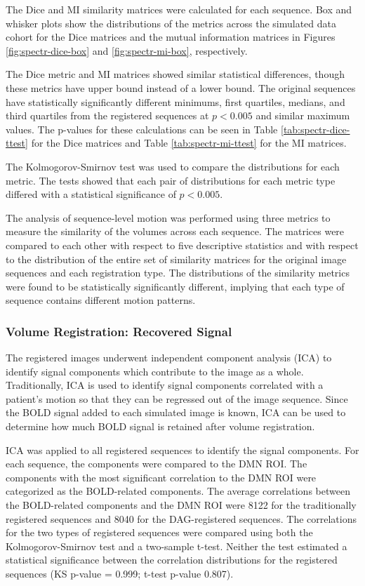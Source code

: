 The Dice and MI similarity matrices were calculated for each sequence. Box and whisker plots show the distributions of the metrics across the simulated data cohort for the Dice matrices and the mutual information matrices in Figures \ref{fig:spectr-dice-box} and \ref{fig:spectr-mi-box}, respectively.  


The Dice metric and MI matrices showed similar statistical differences, though these metrics have upper bound instead of a lower bound. The original sequences have statistically significantly different minimums, first quartiles, medians, and third quartiles from the registered sequences at $p < 0.005$ and similar maximum values. The p-values for these calculations can be seen in Table \ref{tab:spectr-dice-ttest} for the Dice matrices and Table \ref{tab:spectr-mi-ttest} for the MI matrices. 

The Kolmogorov-Smirnov test was used to compare the distributions for each metric. The tests showed that each pair of distributions for each metric type differed with a statistical significance of $p < 0.005$.

The analysis of sequence-level motion was performed using three metrics to measure the similarity of the volumes across each sequence. The matrices were compared to each other with respect to five descriptive statistics and with respect to the distribution of the entire set of similarity matrices for the original image sequences and each registration type. The distributions of the similarity metrics were found to be statistically significantly different, implying that each type of sequence contains different motion patterns.


\subsubsection{Volume Registration: Recovered Signal}

The registered images underwent independent component analysis (ICA) to identify signal components which contribute to the image as a whole. Traditionally, ICA is used to identify signal components correlated with a patient's motion so that they can be regressed out of the image sequence. Since the BOLD signal added to each simulated image is known, ICA can be used to determine how much BOLD signal is retained after volume registration.

ICA was applied to all registered sequences to identify the signal components. For each sequence, the components were compared to the DMN ROI. The components with the most significant correlation to the DMN ROI were categorized as the BOLD-related components. The average correlations between the BOLD-related components and the DMN ROI were 8122 for the traditionally registered sequences and 8040 for the DAG-registered sequences. The correlations for the two types of registered sequences were compared using both the Kolmogorov-Smirnov test and a two-sample t-test. Neither the test estimated a statistical significance between the correlation distributions for the registered sequences (KS p-value = 0.999; t-test p-value 0.807).

